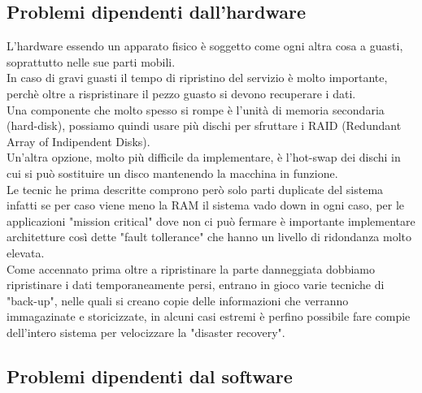 \documentclass[../main.tex]{subfiles}
\begin{document}
	\subsection{Problemi dipendenti dall'hardware}
	L'hardware essendo un apparato fisico è soggetto come ogni altra cosa a guasti, soprattutto nelle sue parti mobili.\\
	In caso di gravi guasti il tempo di ripristino del servizio è molto importante, perchè oltre a rispristinare il pezzo guasto si devono recuperare i dati.\\
	Una componente che molto spesso si rompe è l'unità di memoria secondaria (hard-disk), possiamo quindi usare più dischi per sfruttare i RAID (Redundant Array of Indipendent Disks).\\
	Un'altra opzione, molto più difficile da implementare, è l'hot-swap dei dischi in cui si può sostituire un disco mantenendo la macchina in funzione.\\
	Le tecnic he prima descritte comprono però solo parti duplicate del sistema infatti se per caso viene meno la RAM il sistema vado down in ogni caso, per le applicazioni "mission critical" dove non ci può fermare è importante implementare architetture così dette "fault tollerance" che hanno un livello di ridondanza molto elevata.\\
	Come accennato prima oltre a ripristinare la parte danneggiata dobbiamo ripristinare i dati temporaneamente persi, entrano in gioco varie tecniche di "back-up", nelle quali si creano copie delle informazioni che verranno immagazinate e storicizzate, in alcuni casi estremi è perfino possibile fare compie dell'intero sistema per velocizzare la "disaster recovery".

	\subsection{Problemi dipendenti dal software}
	
\end{document}

